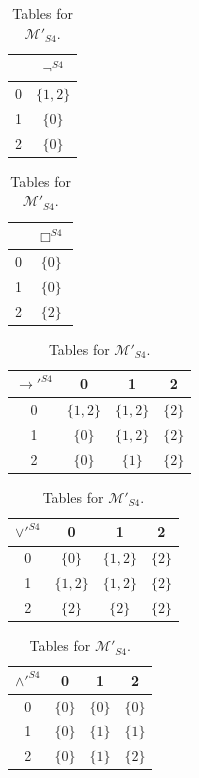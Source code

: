 \documentclass[12pt]{article}
\begin{document}
\begin{table}
    \centering
    \begin{tabular}{|c|c|}
        \hline
          & $\neg^{S4}$ \\ \hline \hline
        0 & $\{ 1, 2 \}$              \\ \hline
        1 & $\{ 0 \}$                 \\ \hline
        2 & $\{ 0 \}$                 \\ \hline
    \end{tabular}
    \begin{tabular}{|c|c|}
        \hline
          & $\Box^{S4}$ \\ \hline\hline
        0 & $\{ 0 \}$                 \\ \hline
        1 & $\{ 0 \}$                 \\ \hline
        2 & $\{ 2 \}$                 \\ \hline
    \end{tabular}
    \begin{tabular}{|c|c|c|c|}
        \hline
        $\rightarrow'^{S4}$ & 0           & 1           & 2           \\ \hline\hline
        0                                & $\{ 1,2 \}$ & $\{ 1,2 \}$ & $\{ 2 \}$ \\ \hline
        1                                & $\{ 0 \}$   & $\{ 1,2 \}$ & $\{ 2 \}$ \\ \hline
        2                                & $\{ 0 \}$   & $\{ 1 \}$   & $\{ 2 \}$ \\ \hline
    \end{tabular}
    \begin{tabular}{|c|c|c|c|}
        \hline
        $\lor'^{S4}$ & 0           & 1           & 2           \\ \hline\hline
        0                                & $\{ 0 \}$ & $\{ 1,2 \}$ & $\{ 2 \}$ \\ \hline
        1                                & $\{ 1,2 \}$   & $\{ 1,2 \}$ & $\{ 2 \}$ \\ \hline
        2                                & $\{ 2 \}$   & $\{2 \}$   & $\{ 2 \}$ \\ \hline
    \end{tabular}  
    \begin{tabular}{|c|c|c|c|}
        \hline
        $\land'^{S4}$ & 0           & 1           & 2           \\ \hline\hline
        0                                & $\{ 0 \}$ & $\{ 0 \}$ & $\{ 0 \}$ \\ \hline
        1                                & $\{ 0 \}$   & $\{ 1 \}$ & $\{ 1 \}$ \\ \hline
        2                                & $\{ 0 \}$   & $\{ 1 \}$   & $\{ 2 \}$ \\ \hline
    \end{tabular}
    \caption{Tables for $\mathcal{M}'_{S4}$.}\label{table:nm_S4*-R}
\end{table}
\end{document}
